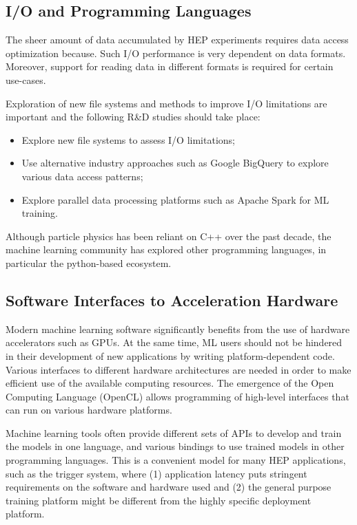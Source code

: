 \subsection{I/O and Programming Languages}\label{sec:software_IO}
The sheer amount of data accumulated by HEP experiments requires data access optimization because. Such I/O performance is very dependent on data formats. Moreover, support for reading data in different formats is required for certain use-cases.

Exploration of new file systems and methods to improve I/O limitations are important and the following R\&D studies should take place:
\begin{itemize}
 \item Explore new file systems to assess I/O limitations;
 \item Use alternative industry approaches such as Google BigQuery to explore various data access patterns;
 \item Explore parallel data processing platforms such as Apache Spark for ML training.
\end{itemize}

Although particle physics has been reliant on C++ over the past decade, the machine learning community has explored other programming languages, in particular the python-based ecosystem.

\subsection{Software Interfaces to Acceleration Hardware}\label{sec:software_proglang}
Modern machine learning software significantly benefits from the use of hardware accelerators such as GPUs. At the same time, ML users should not be hindered in their development of new applications by writing platform-dependent code. Various interfaces to different hardware architectures are needed in order to make efficient use of the available computing resources. The emergence of the Open Computing Language (OpenCL) allows programming of high-level interfaces that can run on various hardware platforms.

Machine learning tools often provide different sets of APIs to develop and train the models in one language, and various bindings to use trained models in other programming languages. This is a convenient model for many HEP applications, such as the trigger system, where (1) application latency puts stringent requirements on the software and hardware used and (2) the general purpose training platform might be different from the highly specific deployment platform.


